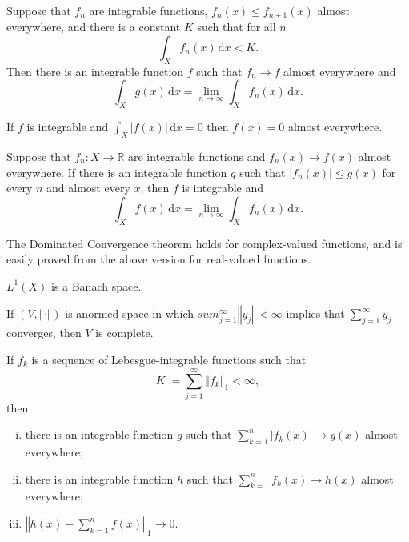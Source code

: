 \documentclass[a4paper]{article}
\newcommand{\R}{\mathbb{R}}
\newcommand{\integ}[4]{\int_{#1}^{#2}\!{#3}\,\mathrm{d}{#4}}
\newcommand{\norm}[1]{\left\Vert #1 \right\Vert}
\newcommand{\<}{\langle}
\renewcommand{\>}{\rangle}
\begin{document}
\begin{thm}
  Suppose that $f_n$ are integrable functions, $f_n(x)\leq f_{n+1}(x)$ almost everywhere, and there is a constant $K$ such that for all $n$
  $$\integ{X}{}{f_n(x)}{x}<K.$$
  Then there is an integrable function $f$ such that $f_n\to f$ almost everywhere and
  $$\integ{X}{}{g(x)}{x} = \lim_{n\to\infty}\integ{X}{}{f_n(x)}{x}.$$
\end{thm}

\begin{prop}
  If $f$ is integrable and $\integ{X}{}{|f(x)|}{x}=0$ then $f(x)=0$ almost everywhere.
\end{prop}

\begin{thm}
  Suppose that $f_n:X\to\R$ are integrable functions and $f_n(x)\to f(x)$ almost everywhere. If there is an integrable function $g$ such that $|f_n(x)|\leq g(x)$ for every $n$ and almost every $x$, then $f$ is integrable and
  $$\integ{X}{}{f(x)}{x} = \lim_{n\to\infty}\integ{X}{}{f_n(x)}{x}.$$
\end{thm}

The Dominated Convergence theorem holds for complex-valued functions, and is easily proved from the above version for real-valued functions.

\begin{thm}
  $L^1(X)$ is a Banach space.
\end{thm}

\begin{lemma}
  If $(V,\norm{\cdot})$ is anormed space in which $sum_{j=1}^\infty\norm{y_j}<\infty$ implies that $\sum_{j=1}^\infty y_j$ converges, then $V$ is complete.
\end{lemma}

\begin{lemma}
  If $f_k$ is a sequence of Lebesgue-integrable functions such that
  $$ K := \sum_{j=1}^\infty\norm{f_k}_1<\infty,$$
  then
  \begin{enumerate}[(i)]
    \item there is an integrable function $g$ such that $\sum_{k=1}^n |f_k(x)| \to g(x)$ almost everywhere;
    \item there is an integrable function $h$ such that $\sum_{k=1}^n f_k(x) \to h(x)$ almost everywhere;
    \item $\norm{h(x)-\sum_{k=1}^n f(x)}_1\to0$.
  \end{enumerate}
\end{lemma}
\end{document}
